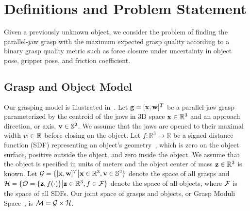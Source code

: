 \section{Definitions and Problem Statement}

Given a previously unknown object, we consider the problem of finding the parallel-jaw grasp with the maximum expected grasp quality according to a binary grasp quality metric such as force closure under uncertainty in object pose, gripper pose, and friction coefficient.

\subsection{Grasp and Object Model}
Our grasping model is illustrated in~.
Let $\mathbf{g} = [\mathbf{x}, \mathbf{w}]^T$ be a parallel-jaw grasp parameterized by the centroid of the jaws in 3D space $\mathbf{x} \in \mathbb{R}^3$ and an approach direction, or axis, $\mathbf{v} \in \mathbb{S}^2$.
We assume that the jaws are opened to their maximal width $w \in\mathbb{R}$ before closing on the object.
Let $f: \mathbb{R}^3 \rightarrow \mathbb{R}$ be a signed distance function (SDF) representing an object's geometry~\cite{mahler2015gp, newcombe2011kinectfusion}, which is zero on the object surface, positive outside the object, and zero inside the object. 
We assume that the object is specified in units of meters and the object center of mass $\mathbf{z} \in \mathbb{R}^3$ is known.
Let $\mathcal{G} = \{ [\mathbf{x}, \mathbf{w}]^T \big| \mathbf{x} \in \mathbb{R}^3, \mathbf{v} \in \mathbb{S}^2\}$ denote the space of all grasps and $\mathcal{H} = \{ \mathcal{O} = \{\mathbf{z}, f(\cdot)\} \big|  \mathbf{z} \in \mathbb{R}^3, f \in \mathcal{F}\}$ denote the space of all objects, where $\mathcal{F}$ is the space of all SDFs.
Our joint space of grasps and objects, or Grasp Moduli Space~\cite{pokorny2013grasp}, is $\mathcal{M} = \mathcal{G} \times \mathcal{H}$.

